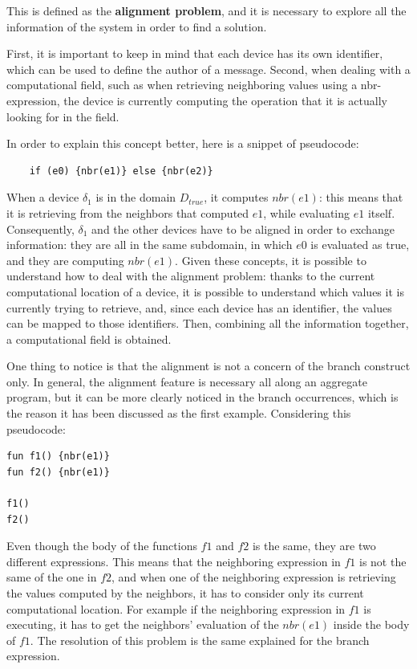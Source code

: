 This is defined as the \textbf{alignment problem}, and it is necessary to explore all the information of the system in order to find a solution.

First, it is important to keep in mind that each device has its own identifier, which can be used to define the author of a message.\newline
Second, when dealing with a computational field, such as when retrieving neighboring values using a nbr-expression, the device is currently computing the operation that it is actually looking for in the field.

In order to explain this concept better, here is a snippet of pseudocode:
\begin{lstlisting}
    if (e0) {nbr(e1)} else {nbr(e2)}
\end{lstlisting}
When a device $\delta_1$ is in the domain $D_{true}$, it computes $nbr(e1)$: this means that it is retrieving from the neighbors that computed $e1$, while evaluating $e1$ itself.\newline
Consequently, $\delta_1$ and the other devices have to be aligned in order to exchange information: they are all in the same subdomain, in which $e0$ is evaluated as true, and they are computing $nbr(e1)$.\newline
Given these concepts, it is possible to understand how to deal with the alignment problem: thanks to the current computational location of a device, it is possible to understand which values it is currently trying to retrieve, and, since each device has an identifier, the values can be mapped to those identifiers. Then, combining all the information together, a computational field is obtained.

One thing to notice is that the alignment is not a concern of the branch construct only. In general, the alignment feature is necessary all along an aggregate program, but it can be more clearly noticed in the branch occurrences, which is the reason it has been discussed as the first example.\newline
Considering this pseudocode:
\begin{lstlisting}
fun f1() {nbr(e1)}
fun f2() {nbr(e1)}

f1()
f2()
\end{lstlisting}
Even though the body of the functions $f1$ and $f2$ is the same, they are two different expressions. This means that the neighboring expression in $f1$ is not the same of the one in $f2$, and when one of the neighboring expression is retrieving the values computed by the neighbors, it has to consider only its current computational location. For example if the neighboring expression in $f1$ is executing, it has to get the neighbors' evaluation of the $nbr(e1)$ inside the body of $f1$. The resolution of this problem is the same explained for the branch expression.

